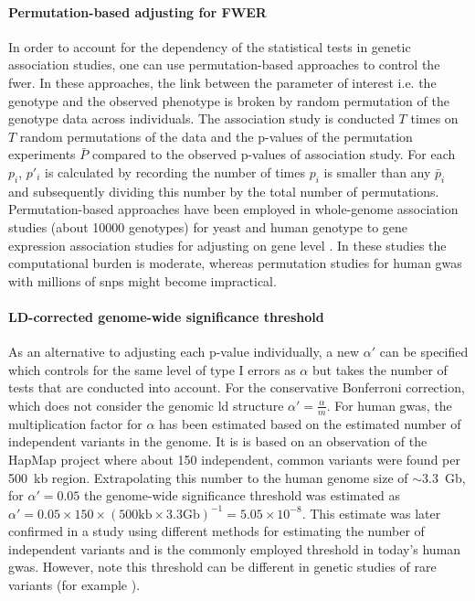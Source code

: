 \paragraph{Permutation-based adjusting for FWER}
In order to account for the dependency of the statistical tests in genetic association studies, one can use permutation-based approaches to control the \gls{fwer}. In these approaches, the link between the parameter of interest i.e. the genotype and the observed phenotype is broken by random permutation of the genotype data across individuals.  The association study is conducted \(T\) times on \(T\)  random permutations of the data and the p-values of the permutation experiments \(\bar{P}\) compared to the observed p-values of association study. For each \(p_i\),   \(p'_i\)  is calculated by recording the number of times \(p_i\) is smaller than any \(\bar{p}_i\) and subsequently dividing this number by the total number of permutations. Permutation-based approaches have been employed in whole-genome association studies (about \num{10000} genotypes) for yeast \citep{Brem2002,Ehrenreich2010,Bloom2013} and human genotype to gene expression association studies for adjusting on gene level \citep{1000Genomes2015}. In these studies the computational burden is moderate, whereas permutation studies for human \gls{gwas} with millions of \glspl{snp} might become impractical. 

\paragraph{LD-corrected genome-wide significance threshold}
As an alternative to adjusting each p-value individually, a new \(\alpha '\) can be specified which controls for the same level of type I errors as \(\alpha\) but takes the number of tests that are conducted into account. For the conservative Bonferroni correction, which does not consider the genomic \gls{ld} structure \(\alpha ' = \frac{\alpha}{m}\). 
For human \gls{gwas}, the multiplication factor for \(\alpha \) has been estimated based on the estimated number of independent variants in the genome.  It is is based on an observation of the HapMap project \citep{HapMap2005} where about \num{150} independent, common variants were found per \num{500}~kb region.  Extrapolating this number to the human genome size of \(\sim 3.3\)~Gb, for \(\alpha ' =0.05\) the genome-wide significance threshold was estimated as  \(\alpha '= 0.05 \times 150 \times \left(500\text{kb} \times 3.3 \text{Gb}\right)^{-1}= 5.05 \times 10^{-8}\). This estimate was later confirmed in a study using different methods for estimating the number of independent variants \citep{Fadista2016} and is the commonly employed threshold in today's human \gls{gwas}. However, note this threshold can be different in genetic studies of rare variants (for example \citep{Xu2014}).

